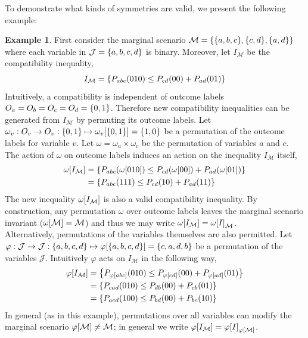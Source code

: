 \documentclass[aps, 10pt, english, twoside, pra, nofootinbib, longbibliography]{revtex4-1}
\theoremstyle{plain}
\theoremstyle{definition}
\newtheorem{example}[theorem]{Example}
\theoremstyle{remark}
\newcommand{\gep}{\varphi}
\newcommand{\geo}{\omega}
\newcommand{\mscenario}{\mathcal{M}}
\newcommand{\jointvar}{\mathcal{J}}
\begin{document}
    To demonstrate what kinds of symmetries are valid, we present the following example:
    \begin{example}
        \label{ex:symmetries}
        First consider the marginal scenario $\mscenario = \bc{\bc{a, b, c}, \bc{c, d}, \bc{a, d}}$ where each variable in $\jointvar = \bc{a,b,c,d}$ is binary. Moreover, let $I_{\mscenario}$ be the compatibility inequality,
        \[ I_{\mscenario} = \bc{\prob[abc][010] \leq \prob[cd][00] + \prob[ad][01]}  \]
        Intuitively, a compatibility is independent of outcome labels $O_a = O_b = O_c = O_d = \bc{0,1}$. Therefore new compatibility inequalities can be generated from $I_{\mscenario}$ by permuting its outcome labels. Let $\geo_v : O_v \to O_v : \bc{0,1} \mapsto \geo_v\bs{\bc{0,1}} = \bc{1,0}$ be a permutation of the outcome labels for variable $v$. Let $\geo = \geo_a \times \geo_c$ be the permutation of variables $a$ and $c$. The action of $\geo$ on outcome labels induces an action on the inequality $I_{\mscenario}$ itself,
        \begin{align*}
        \geo\bs{I_{\mscenario}} &= \bc{\prob[abc][\geo\bs{010}] \leq \prob[cd][\geo\bs{00}] + \prob[ad][\geo\bs{01}]} \\
        &= \bc{\prob[abc][111] \leq \prob[cd][10] + \prob[ad][11]}
        \end{align*}
        The new inequality $\geo\bs{I_{\mscenario}}$ is also a valid compatibility inequality. By construction, any permutation $\geo$ over outcome labels leaves the marginal scenario invariant ($\geo\bs{\mscenario} = \mscenario$) and thus we may write $\geo\bs{I_{\mscenario}} = \geo\bs{I}_{\mscenario}$. \\

        Alternatively, permutations of the variables themselves are also permitted. Let $\gep : \jointvar \to \jointvar : \bc{a,b,c,d} \mapsto \gep\bs{\bc{a,b,c,d}} = \bc{c,a,d,b}$ be a permutation of the variables $\jointvar$. Intuitively $\gep$ acts on $I_{\mscenario}$ in the following way,
        \begin{align*}
        \gep\bs{I_{\mscenario}} &= \bc{\prob[\gep\bs{abc}][010] \leq \prob[\gep\bs{cd}][00] + \prob[\gep\bs{ad}][01]} \\
        &= \bc{\prob[cad][010] \leq \prob[db][00] + \prob[cb][01]} \\
        &= \bc{\prob[acd][100] \leq \prob[bd][00] + \prob[bc][10]}
        \end{align*}
        In general (as in this example), permutations over all variables can modify the marginal scenario $\gep\bs{\mscenario} \neq \mscenario$; in general we write $\gep\bs{I_{\mscenario}} = \gep\bs{I}_{\gep\bs{\mscenario}}$.
    \end{example}
\end{document}
